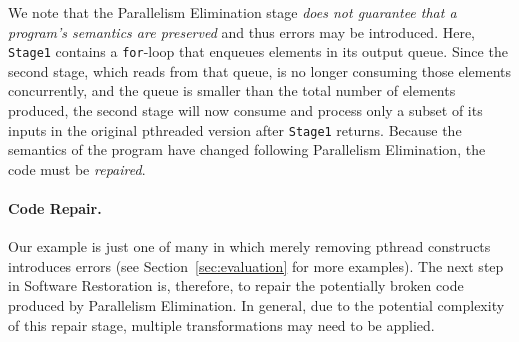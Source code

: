 \noindent
%
%
We note that the Parallelism Elimination stage \emph{does not guarantee that a program's semantics are preserved} and thus errors may be introduced.
%
%
Here, \lstinline|Stage1| contains a \lstinline|for|-loop that enqueues elements in its output queue. Since the second stage, which reads from that queue, is no longer consuming those elements concurrently, and the queue is smaller than the total number of elements produced, the second stage will now consume and process only a subset of its inputs in the original pthreaded version after \lstinline|Stage1| returns.
%
%
%
Because the semantics of the program have changed following Parallelism Elimination, the code must be \emph{repaired}.



\paragraph{Code Repair.}
%
Our example is just one of many in which merely removing pthread constructs introduces errors (see Section~\ref{sec:evaluation} for more examples). The next step in Software Restoration is, therefore, to repair the potentially broken code produced by Parallelism Elimination. In general, due to the potential complexity of this repair stage, multiple transformations may need to be applied.
%

